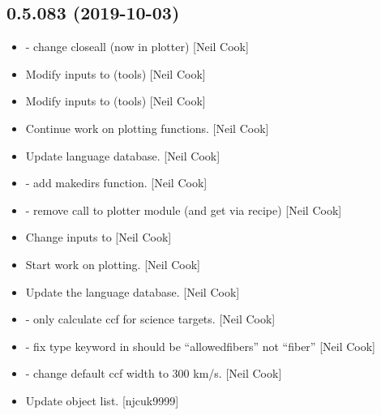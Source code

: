 \documentclass[a4paper,10pt,english]{report}
\begin{document}
\subsection{0.5.083 (2019-10-03)}
\label{\detokenize{misc/changelog:id59}}\begin{itemize}
\item {} 
 - change closeall (now in
plotter) {[}Neil Cook{]}

\item {} 
Modify inputs to  (tools) {[}Neil Cook{]}

\item {} 
Modify inputs to  (tools) {[}Neil Cook{]}

\item {} 
Continue work on plotting functions. {[}Neil Cook{]}

\item {} 
Update language database. {[}Neil Cook{]}

\item {} 
 - add makedirs function. {[}Neil Cook{]}

\item {} 
 - remove call to plotter module (and get via
recipe) {[}Neil Cook{]}

\item {} 
Change inputs to  {[}Neil Cook{]}

\item {} 
Start work on plotting. {[}Neil Cook{]}

\item {} 
Update the language database. {[}Neil Cook{]}

\item {} 
 - only calculate ccf for science targets.
{[}Neil Cook{]}

\item {} 
 - fix type keyword in 
should be “allowedfibers” not “fiber” {[}Neil Cook{]}

\item {} 
 - change default ccf
width to 300 km/s. {[}Neil Cook{]}

\item {} 
Update object list. {[}njcuk9999{]}


\end{itemize}
\end{document}
